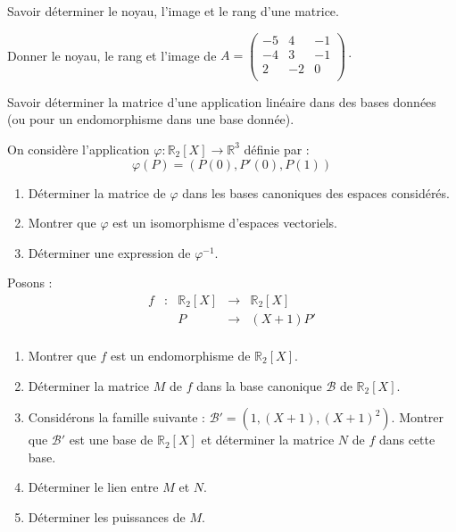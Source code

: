 \documentclass[a4paper,twoside,french,11pt]{VcCours}
\begin{document}
\begin{ptc}{}
	Savoir déterminer le noyau, l'image et le rang d'une matrice.
\end{ptc} 

\begin{Exercice}{}
  Donner le noyau, le rang et l'image de $A = \begin{pmatrix}
    -5 & 4 & -1 \\
    -4 & 3 & - 1 \\
    2 	 & -2 & 0 \\
  \end{pmatrix}\cdot$
\end{Exercice} 
  
\begin{ptc}{}
	Savoir déterminer la matrice d'une application linéaire dans des bases données (ou pour un endomorphisme dans une base donnée).
\end{ptc}

\begin{Exercice}{}
  On considère l'application $\varphi : \mathbb{R}_2[X] \rightarrow \mathbb{R}^3$ définie par :
  \[ \varphi(P)=(P(0),P'(0),P(1)) \]
  
  \begin{enumerate}
    \item Déterminer la matrice de $\varphi$ dans les bases canoniques des espaces considérés.
    \item Montrer que $\varphi$ est un isomorphisme d'espaces vectoriels.
    \item Déterminer une expression de $\varphi^{-1}$.
  \end{enumerate}
\end{Exercice} 

\begin{Exercice}{}
  Posons :
  $$ \begin{array}{ccccl}
    f & : & \mathbb{R}_2[X] & \rightarrow & \mathbb{R}_2[X] \\
    & & P & \rightarrow & (X+1)P' \\
  \end{array} $$
  \begin{enumerate}
    \item Montrer que $f$ est un endomorphisme de $ \mathbb{R}_2[X]$.
    \item Déterminer la matrice $M$ de $f$ dans la base canonique $\mathcal{B}$ de $\mathbb{R}_2[X]$.
    \item Considérons la famille suivante : $\mathcal{B}'= (1, (X+1),(X+1)^2)$. Montrer que $\mathcal{B}'$ est une base de $\mathbb{R}_2[X]$ et déterminer la matrice $N$ de $f$ dans cette base.
    \item Déterminer le lien entre $M$ et $N$.
    \item Déterminer les puissances de $M$.
  \end{enumerate}
\end{Exercice} 
\end{document}
